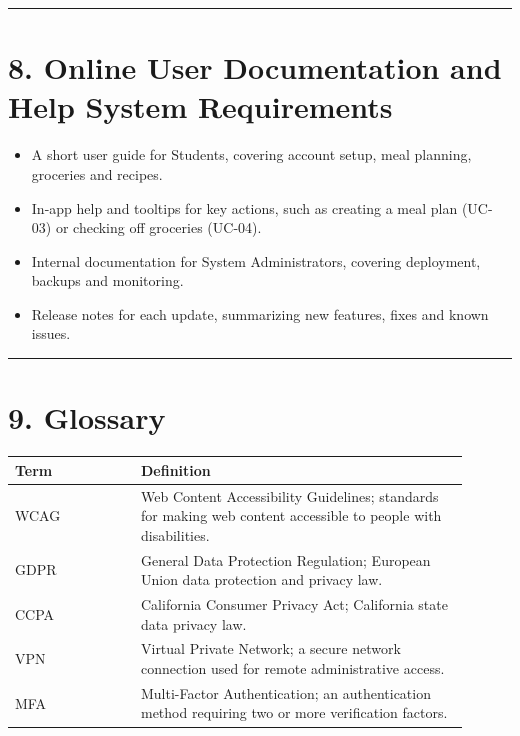 \documentclass[10pt,letterpaper]{article}
\newcommand{\ucseparator}{\vspace{1em}\noindent\rule{\linewidth}{0.4pt}\vspace{1.5em}}
\begin{document}
\ucseparator

\section*{8. Online User Documentation and Help System Requirements}

\begin{itemize}
    \item A short user guide for Students, covering account setup, meal planning, groceries and recipes.
    \item In-app help and tooltips for key actions, such as creating a meal plan (UC-03) or checking off groceries (UC-04).
    \item Internal documentation for System Administrators, covering deployment, backups and monitoring.
    \item Release notes for each update, summarizing new features, fixes and known issues.
\end{itemize}

\ucseparator

\section*{9. Glossary}

\begin{longtable}{|p{0.25\linewidth}|p{0.65\linewidth}|}
\hline
\textbf{Term} & \textbf{Definition} \\
\hline
WCAG & Web Content Accessibility Guidelines; standards for making web content accessible to people with disabilities. \\
\hline
GDPR & General Data Protection Regulation; European Union data protection and privacy law. \\
\hline
CCPA & California Consumer Privacy Act; California state data privacy law. \\
\hline
VPN & Virtual Private Network; a secure network connection used for remote administrative access. \\
\hline
MFA & Multi-Factor Authentication; an authentication method requiring two or more verification factors. \\
\hline
\end{longtable}
\end{document}
